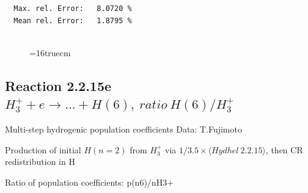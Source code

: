 \documentclass[12pt,dvips]{article}
\begin{document}
\begin{small}
\begin{verbatim}
  Max. rel. Error:   8.0720 %
  Mean rel. Error:   1.8795 %


\end{verbatim}\end{small}
\begin{figure} \label{2.2.15d}
\epsfxsize=16truecm
\end{figure}
\newpage
\subsection{
Reaction 2.2.15e $ H_3^+ + e \rightarrow ...+ H(6) , \   ratio ~ H(6)/H_3^+  $
}

 Multi-step hydrogenic population coefficients
 Data: T.Fujimoto

 Production of initial $H(n=2)$ from $H_3^+$ via $1/3.5 \times \langle Hydhel~ 2.2.15\rangle$,
 then CR redistribution in H

 Ratio of population coefficients: p(n6)/nH3+
\end{document}
